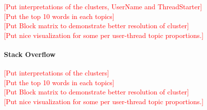 \documentclass{sig-alternate}
\newcommand{\comment}[1]{\textcolor{red}{[#1]}}
\begin{document}
 \comment{Put interpretations of the clusters, UserName and
ThreadStarter}\\
\comment{Put the top 10 words in each topics}\\
\comment{Put Block matrix to demonstrate better resolution of cluster}\\
\comment{Put nice visualization for some per user-thread topic proportions.}\\
\paragraph{Stack Overflow} 
\comment{Put interpretations of the clusters}\\
\comment{Put the top 10 words in each topics}\\
\comment{Put Block matrix to demonstrate better resolution of cluster}\\
\comment{Put nice visualization for some per user-thread topic proportions.}\\
\end{document}

